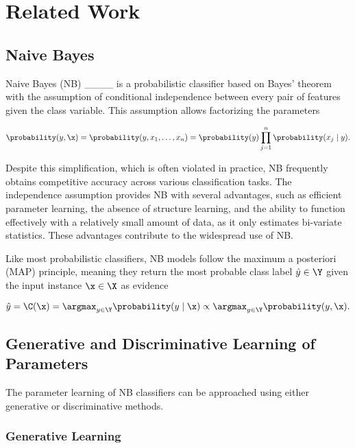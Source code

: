 \section{Related Work}
\label{sec:relatedWork}


\subsection{Naive Bayes}\label{subsec:NB}

Naive Bayes (NB) ____ is a probabilistic classifier based on Bayes' theorem with the assumption of conditional independence between every pair of features given the class variable. This assumption allows factorizing the parameters

\begin{equation*}
\probability(y, \x) = \probability(y,x_1,\dots,x_n) = \probability(y) \prod_{j = 1}^{n} \probability(x_j \mid y).
\end{equation*}

Despite this simplification, which is often violated in practice, NB frequently obtains competitive accuracy across various classification tasks. The independence assumption provides NB with several advantages, such as efficient parameter learning, the absence of structure learning, and the ability to function effectively with a relatively small amount of data, as it only estimates bi-variate statistics. These advantages contribute to the widespread use of NB.

Like most probabilistic classifiers, NB models follow the maximum a posteriori (MAP) principle, meaning they return the most probable class label \(\hat{y} \in \Y\) given the input instance \(\x \in \X\) as evidence

\begin{equation*}
    \hat{y} = \C(\x) = \argmax_{y \in \Y} \probability(y \mid \x) \propto \argmax_{y \in \Y} \probability(y, \x).
\end{equation*}

\subsection{Generative and Discriminative Learning of Parameters}\label{subsec:genDiscNB}

The parameter learning of NB classifiers can be approached using either generative or discriminative methods.

\subsubsection{Generative Learning}

